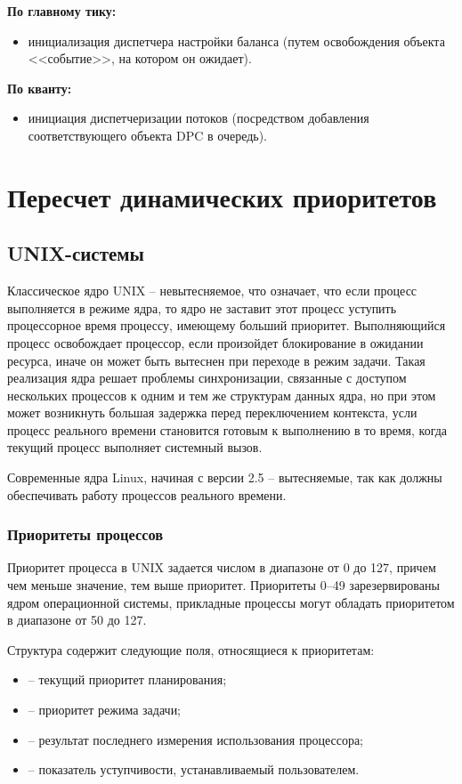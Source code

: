 \textbf{По главному тику:}
\begin{itemize}
	\item инициализация диспетчера настройки баланса (путем освобождения объекта <<событие>>, на котором он ожидает).
\end{itemize}

\textbf{По кванту:}
\begin{itemize}
	\item инициация диспетчеризации потоков (посредством добавления соответствующего объекта {\ttfamily DPC} в очередь).
\end{itemize}

\chapter{Пересчет динамических приоритетов}

\section{UNIX-системы}

Классическое ядро UNIX -- невытесняемое, что означает, что если процесс выполняется в режиме ядра, то ядро не заставит этот процесс уступить процессорное время процессу, имеющему больший приоритет. Выполняющийся процесс освобождает процессор, если произойдет блокирование в ожидании ресурса, иначе он может быть вытеснен при переходе в режим задачи. Такая реализация ядра решает проблемы синхронизации, связанные с доступом нескольких процессов к одним и тем же структурам данных ядра, но при этом может возникнуть большая задержка перед переключением контекста, усли процесс реального времени становится готовым к выполнению в то время, когда текущий процесс выполняет системный вызов.

Современные ядра Linux, начиная с версии 2.5 -- вытесняемые, так как должны обеспечивать работу процессов реального времени.

\subsection{Приоритеты процессов}

Приоритет процесса в UNIX задается числом в диапазоне от 0 до 127, причем чем меньше значение, тем выше приоритет. Приоритеты 0--49 зарезервированы ядром операционной системы, прикладные процессы могут обладать приоритетом в диапазоне от 50 до 127.

Структура  содержит следующие поля, относящиеся к приоритетам:
\begin{itemize}
	\item {} -- текущий приоритет планирования;
	\item {} -- приоритет режима задачи;
	\item {} -- результат последнего измерения использования процессора;
	\item {} -- показатель уступчивости, устанавливаемый пользователем.
\end{itemize}

